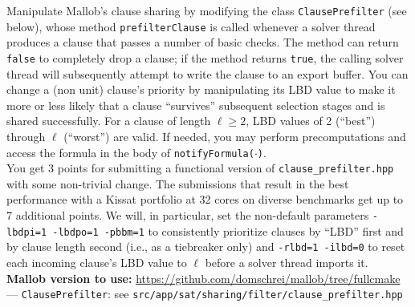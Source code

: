 \documentclass[a4paper]{article}
\begin{document}
Manipulate Mallob's clause sharing by modifying the class \texttt{ClausePrefilter} (see below), whose method \texttt{prefilterClause} is called whenever a solver thread produces a clause that passes a number of basic checks.
The method can return \texttt{false} to completely drop a clause;
if the method returns \texttt{true}, the calling solver thread will subsequently attempt to write the clause to an export buffer.
You can change a (non unit) clause's priority by manipulating its LBD value to make it more or less likely that a clause ``survives'' subsequent selection stages and is shared successfully.
For a clause of length $\ell \geq 2$, LBD values of 2 (``best'') through $\ell$ (``worst'') are valid.
If needed, you may perform precomputations and access the formula in the body of \texttt{notifyFormula($\cdot$)}.
\\[1em]
You get 3 points for submitting a functional version of \texttt{clause\_prefilter.hpp} with some non-trivial change.
The submissions that result in the best performance with a Kissat portfolio at 32 cores on diverse benchmarks get up to 7 additional points.
We will, in particular, set the non-default parameters \texttt{-lbdpi=1 -lbdpo=1 -pbbm=1} to consistently prioritize clauses by ``LBD'' first and by clause length second (i.e., as a tiebreaker only) and \texttt{-rlbd=1 -ilbd=0} to reset each incoming clause's LBD value to $\ell$ before a solver thread imports it.
\\[1em]
\textbf{Mallob version to use:} \url{https://github.com/domschrei/mallob/tree/fullcmake}
\\
--- \texttt{ClausePrefilter}: see \texttt{src/app/sat/sharing/filter/clause\_prefilter.hpp}

\end{document}
